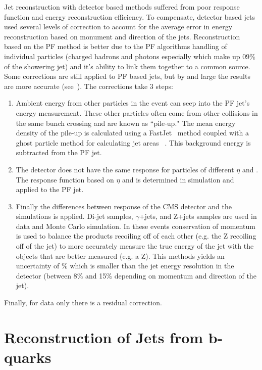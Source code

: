 	Jet reconstruction with detector based methods suffered from poor response function and energy reconstruction efficiency. To compensate, detector based jets used several levels of correction to account for the average error in energy reconstruction based on monument and direction of the jets. Reconstruction based on the PF method is better due to the PF algorithms handling of individual particles (charged hadrons and photons especially which make up 09\% of the showering jet) and it's ability to link them together to a common source. Some corrections are still applied to PF based jets, but by and large the results are more accurate (see~\cite{cmsjetcal}). The corrections take 3 steps:
	\begin{enumerate}
	\item Ambient energy from other particles in the event can seep into the PF jet's energy measurement. These other particles often come from other collisions in the same bunch crossing and are known as ``pile-up." The mean energy density of the pile-up is calculated using a FastJet~\cite{fastjet} method coupled with a ghost particle method for calculating jet areas ~\cite{jetarea}. This background energy is subtracted from the PF jet.\\
	\item The detector does not have the same response for particles of different $\eta$ and \pt. The response function based on $\eta$ and \pt is determined in simulation and applied to the PF jet.\\
	\item Finally the differences between response of the CMS detector and the simulations is applied. Di-jet samples, $\gamma$+jets, and Z+jets samples are used in data and Monte Carlo simulation. In these events conservation of momentum is used to balance the products recoiling off of each other (e.g. the Z recoiling off of the jet) to more accurately measure the true energy of the jet with the objects that are better measured (e.g. a Z). This methods yields an uncertainty of \% which is smaller than the jet energy resolution in the detector (between 8\% and 15\% depending on momentum and direction of the jet).\\
	\end{enumerate}
	
	Finally, for data only there is a residual correction.\\
	
	
	
	
	\section{Reconstruction of Jets from b-quarks}
	
